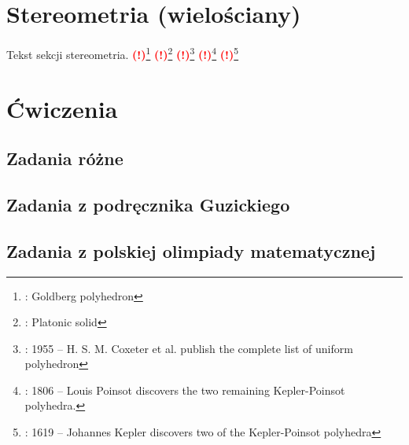 \documentclass{greaseproof}
\newcommand{\todofoot}[1]{\textcolor{red}{\textbf{(!)}\footnote{\textbf{\color{red}{Do zrobienia}}: #1}}}
\begin{document}
\chapter{Stereometria (wielościany)}
Tekst sekcji stereometria.
\todofoot{Goldberg polyhedron} %
\todofoot{Platonic solid} %
\todofoot{1955 – H. S. M. Coxeter et al. publish the complete list of uniform polyhedron}
\todofoot{1806 – Louis Poinsot discovers the two remaining Kepler-Poinsot polyhedra.}
\todofoot{1619 – Johannes Kepler discovers two of the Kepler-Poinsot polyhedra}

\chapter{Ćwiczenia}
\section{Zadania różne}


\section{Zadania z podręcznika Guzickiego}


\section{Zadania z polskiej olimpiady matematycznej}

\end{document}
